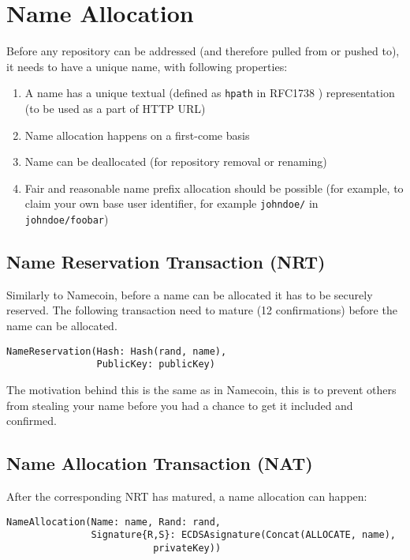 \documentclass[a4paper]{article}
\begin{document}
\section{Name Allocation}

Before any repository can be addressed (and therefore pulled from or pushed to), it needs to have a unique name, with following properties:

\begin{enumerate}
\item A name has a unique textual (defined as \texttt{hpath} in RFC1738 \cite{rfc1738}) representation (to be used as a part of HTTP URL)
\item Name allocation happens on a first-come basis
\item Name can be deallocated (for repository removal or renaming)
\item Fair and reasonable name prefix allocation should be possible (for example, to claim your own base user identifier, for example \texttt{johndoe/} in \texttt{johndoe/foobar})
\end{enumerate}

\subsection{Name Reservation Transaction (NRT)}

Similarly to Namecoin, before a name can be allocated it has to be securely reserved. The following transaction need to mature (12 confirmations) before the name can be allocated.


\begin{verbatim}
NameReservation(Hash: Hash(rand, name),
                PublicKey: publicKey)
\end{verbatim}

The motivation behind this is the same as in Namecoin, this is to prevent others from stealing your name before you had a chance to get it included and confirmed.

\subsection{Name Allocation Transaction (NAT)}

After the corresponding NRT has matured, a name allocation can happen:

\begin{verbatim}
NameAllocation(Name: name, Rand: rand,
               Signature{R,S}: ECDSAsignature(Concat(ALLOCATE, name),
                          privateKey))
\end{verbatim}
\end{document}
